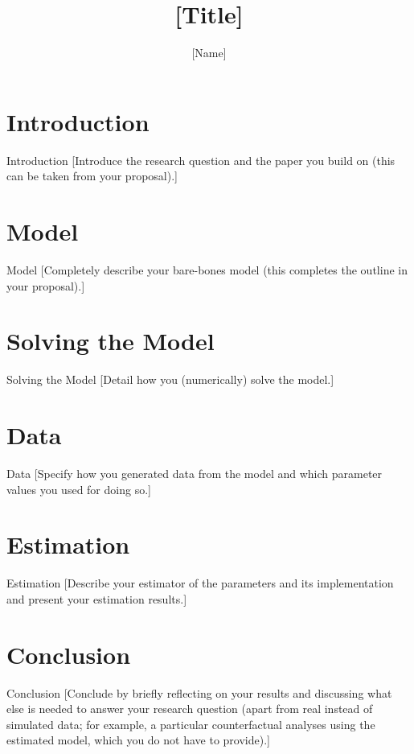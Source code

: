\documentclass[aspectratio=1610]{beamer}
\title{[Title]}
\author{[Name]}
\date{}
\begin{document}
\frame{\titlepage}

\section{Introduction}
\begin{frame}{Introduction}
[Introduce the research question and the paper you build on (this can be taken from your proposal).]
\end{frame}

\section{Model}
\begin{frame}{Model}
[Completely describe your bare-bones model (this completes the outline in your proposal).]
\end{frame}

\section{Solving the Model}
\begin{frame}{Solving the Model}
[Detail how you (numerically) solve the model.]
\end{frame}

\section{Data}
\begin{frame}{Data}
[Specify how you generated data from the model and which parameter values you used for doing so.]
\end{frame}

\section{Estimation}
\begin{frame}{Estimation}
[Describe your estimator of the parameters and its implementation and present your estimation results.]
\end{frame}

\section{Conclusion}
\begin{frame}{Conclusion}
[Conclude by briefly reflecting on your results and discussing what else is needed to answer your research question (apart from real instead of simulated data; for example, a particular counterfactual analyses using the estimated model, which you do not have to provide).]
\end{frame}
\end{document}
